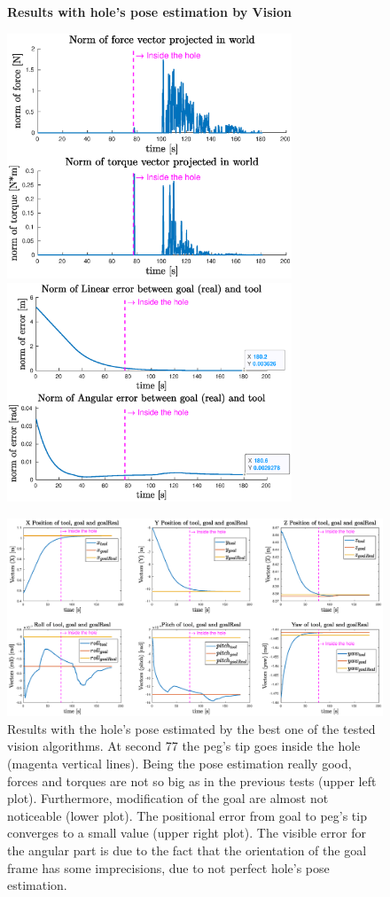 \begin{figure}[H]
	\centering
	\textbf{Results with hole's pose estimation by Vision}\\
	\vspace*{20px}
	\centerline{
		\includegraphics[width=8.5cm]{withVisio/forceNorm.eps}
		\includegraphics[width=8.5cm]{withVisio/errorNorm.eps}
	}
	\vspace{30px}
	\centerline{
		\includegraphics[width=19.5cm]{withVisio/6_error.eps}
	}
	\vspace{10px}
	\caption[Plots of results with hole's pose estimation by Vision]{Results with the hole's pose estimated by the best one of the tested vision algorithms. At second 77 the peg's tip goes inside the hole (magenta vertical lines). Being the pose estimation really good, forces and torques are not so big  as in the previous tests (upper left plot). Furthermore, modification of the goal are almost not noticeable (lower plot). The positional error from goal to peg's tip  converges to a small value (upper right plot). The visible error for the angular part is due to the fact that the orientation of the goal frame has some imprecisions, due to not perfect hole's pose estimation.}
	\label{fig:expWithVisio}
\end{figure}

